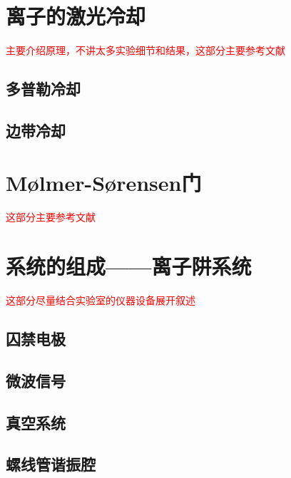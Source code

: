 \section[离子的激光冷却]{离子的激光冷却}
\textcolor{red}{主要介绍原理，不讲太多实验细节和结果，\textcolor{red}{这部分主要参考文献\cite[p16-19]{Leibfried_Blatt_Monroe_Wineland_2003}}}
\subsection[多普勒冷却]{多普勒冷却}

\subsection[边带冷却]{边带冷却}



\section[Mølmer-Sørensen门]{Mølmer-Sørensen门}
\textcolor{red}{这部分主要参考文献\cite[]{Azuma_2023}}





\section[系统的组成——离子阱系统]{系统的组成——离子阱系统}
\textcolor{red}{这部分尽量结合实验室的仪器设备展开叙述}

\subsection[囚禁电极]{囚禁电极}


\subsection[微波信号]{微波信号}


\subsection[真空系统]{真空系统}


\subsection[螺线管谐振腔]{螺线管谐振腔}











